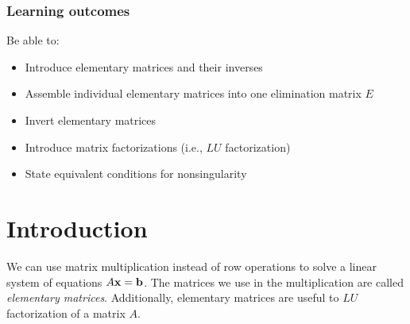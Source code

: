 


\subsubsection*{Learning outcomes}
Be able to:
\begin{itemize}
	\item Introduce elementary matrices and their inverses
	\item Assemble individual elementary matrices into one elimination matrix $E$
	\item Invert elementary matrices
	\item Introduce matrix factorizations (i.e., $LU$ factorization)
	
	\item State equivalent conditions for nonsingularity
	
\end{itemize}








%
\section*{Introduction}

We can use matrix multiplication instead of row operations to solve a linear system of equations $A {\bf x} = {\bf b}$.  The matrices we use in the multiplication are called \textit{elementary matrices}.  Additionally, elementary matrices are useful to $LU$ factorization of a matrix $A$.





